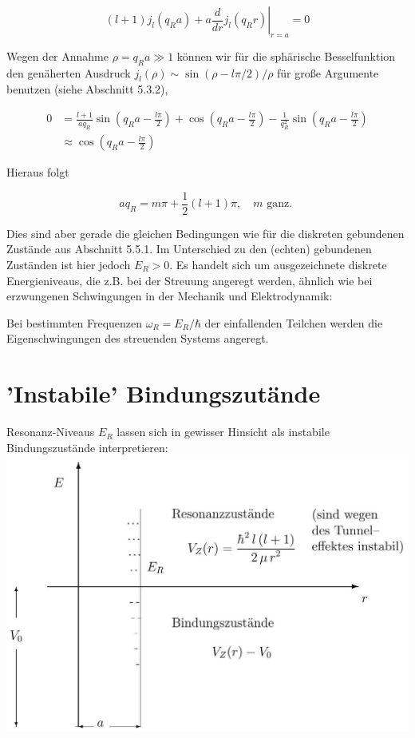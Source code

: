 \documentclass[10pt, letterpaper]{article}
\begin{document}
$$
(l+1) j_{l}\left(q_{R} a\right)+\left.a \frac{d}{d r} j_{l}\left(q_{R} r\right)\right|_{r=a}=0
$$

Wegen der Annahme $\rho=q_{R} a \gg 1$ können wir für die sphärische Besselfunktion den genäherten Ausdruck $j_{l}(\rho) \sim \sin (\rho-l \pi / 2) / \rho$ für große Argumente benutzen (siehe Abschnitt 5.3.2),

$$
\begin{aligned}
0 & =\frac{l+1}{a q_{R}} \sin \left(q_{R} a-\frac{l \pi}{2}\right)+\cos \left(q_{R} a-\frac{l \pi}{2}\right)-\frac{1}{q_{R}^{2}} \sin \left(q_{R} a-\frac{l \pi}{2}\right) \\
& \approx \cos \left(q_{R} a-\frac{l \pi}{2}\right)
\end{aligned}
$$

Hieraus folgt

$$
a q_{R}=m \pi+\frac{1}{2}(l+1) \pi, \quad m \text { ganz. }
$$

Dies sind aber gerade die gleichen Bedingungen wie für die diskreten gebundenen Zustände aus Abschnitt 5.5.1. Im Unterschied zu den (echten) gebundenen Zuständen ist hier jedoch $E_{R}>0$. Es handelt sich um ausgezeichnete diskrete Energieniveaus, die z.B. bei der Streuung angeregt werden, ähnlich wie bei erzwungenen Schwingungen in der Mechanik und Elektrodynamik:

Bei bestimmten Frequenzen $\omega_{R}=E_{R} / \hbar$ der einfallenden Teilchen werden die Eigenschwingungen des streuenden Systems angeregt.

\section*{'Instabile' Bindungszutände}
Resonanz-Niveaus $E_{R}$ lassen sich in gewisser Hinsicht als instabile Bindungszustände interpretieren:\\
\includegraphics[scale=0.2, center]{2025_05_21_d5590f158a899e385c7cg-21}
\end{document}
